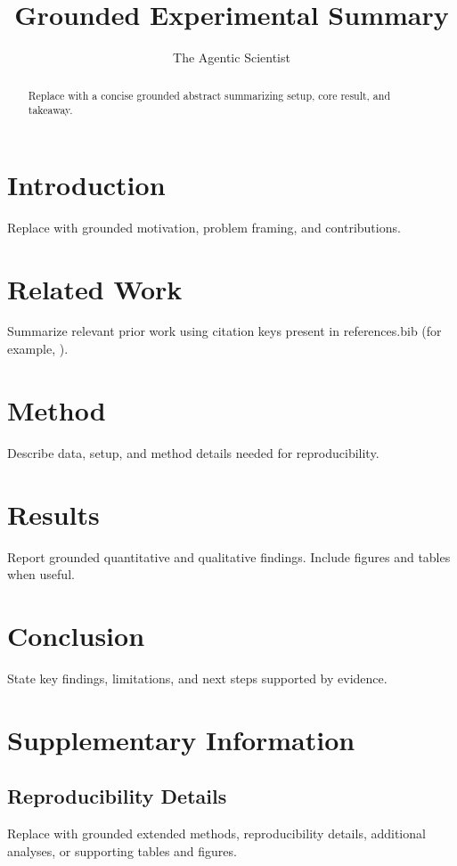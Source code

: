 \documentclass{article} %
\title{Grounded Experimental Summary}
\author{The Agentic Scientist}
\begin{document}
\maketitle

\begin{abstract}
Replace with a concise grounded abstract summarizing setup, core result, and takeaway.
\end{abstract}

\section{Introduction}
Replace with grounded motivation, problem framing, and contributions.

\section{Related Work}
Summarize relevant prior work using citation keys present in references.bib (for example, \citep{templateReference2026}).

\section{Method}
Describe data, setup, and method details needed for reproducibility.

\section{Results}
Report grounded quantitative and qualitative findings. Include figures and tables when useful.

\section{Conclusion}
State key findings, limitations, and next steps supported by evidence.

\clearpage



\clearpage
\appendix
\section{Supplementary Information}
\subsection{Reproducibility Details}
Replace with grounded extended methods, reproducibility details, additional analyses, or supporting tables and figures.
\end{document}

